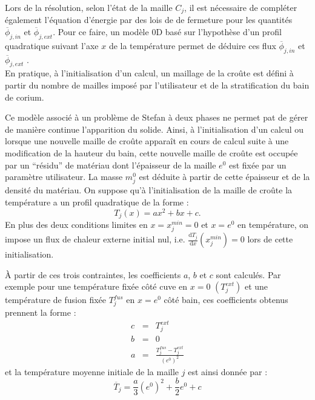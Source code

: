 Lors de la résolution, selon l'état de la maille $C_j$, il est nécessaire de compléter également l'équation d'énergie par des lois de de fermeture pour les quantités $\overline{\phi}_{j,in}$ et $\overline{\phi}_{j,ext}$. Pour ce faire, un modèle 0D basé sur l'hypothèse d'un profil quadratique suivant l'axe $x$ de la température permet de déduire ces flux $\overline{\phi}_{j,in}$ et $\overline{\phi}_{j,ext}$ \cite{LeTellier2016}.\\

En pratique, à l'initialisation d'un calcul, un maillage de la croûte est défini à partir du nombre de mailles imposé par l'utilisateur et de la stratification du bain de corium. 

Ce modèle associé à un problème de Stefan à deux phases ne permet pat de gérer de manière continue l'apparition du solide. Ainsi, à l'initialisation d'un calcul ou lorsque une nouvelle maille de croûte apparaît en cours de calcul suite à une modification de la hauteur du bain, cette nouvelle maille de croûte est occupée par un ``résidu'' de matériau dont l'épaisseur de la maille $e^0$ est fixée par un paramètre utilisateur. La masse $m_j^0$ est déduite à partir de cette épaisseur et de la densité du matériau. On suppose qu'à l'initialisation de la maille de croûte la température a un profil quadratique de la forme : 
$$T_j(x)=ax^2+bx+c.$$
En plus des deux conditions limites en $x=x_j^{min}=0$ et $x=e^0$ en température, on impose un flux de chaleur externe initial nul, i.e. $\frac{\mathrm{d}T_j}{\mathrm{d}x}(x_j^{min}) = 0$ lors de cette initialisation.

À partir de ces trois contraintes, les coefficients $a$, $b$ et $c$ sont calculés. Par exemple pour une température fixée côté cuve en $x=0$ $(T_j^{ext})$ et une température de fusion fixée $T_j^{fus}$ en $x=e^0$ côté bain, ces coefficients obtenus prennent la forme :
\begin{eqnarray*}
c &=& T^{ext}_j \\
b &=& 0 \\
a &=& \frac{T_j^{fus}-T^{ext}_j}{({e^0})^2}
\end{eqnarray*}
et la température moyenne initiale de la maille $j$ est ainsi donnée par :
$$\overline{T}_{j}=\frac{a}{3} ({e^0})^2 + \frac{b}{2} e^0 + c$$